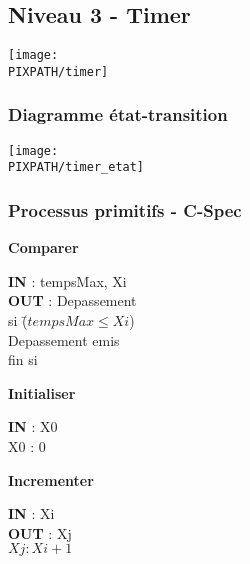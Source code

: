 \subsection{Niveau 3 - Timer}

\begin{center}
\texttt{[image: \\PIXPATH/timer]}
\end{center}


\subsubsection{Diagramme état-transition}

\begin{center}
\texttt{[image: \\PIXPATH/timer\_etat]}
\end{center}

\subsubsection{Processus primitifs - C-Spec}

\begin{description}
	
	\item \textbf{Comparer}
		\begin{tabbing} 
		\textbf{IN} : tempsMax, Xi \\
		\textbf{OUT} : Depassement\\
		si \=($tempsMax \leq Xi$) \\
			\>Depassement emis \\
		fin si 
		\end{tabbing}

	\item \textbf{Initialiser}
		\begin{tabbing} 
		\textbf{IN} : X0 \\
		X0 : 0
		\end{tabbing}

	\item \textbf{Incrementer}
		\begin{tabbing} 
		\textbf{IN} : Xi \\
		\textbf{OUT} : Xj \\
		$Xj : Xi + 1$
		\end{tabbing}


\end{description}

\vfill
\pagebreak


